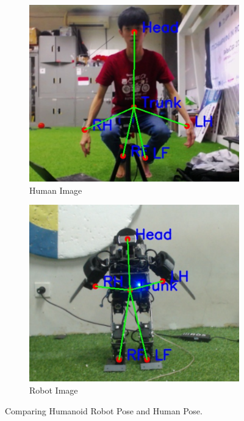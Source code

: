 \begin{figure}
  \centering
  \begin{subfigure}[b]{0.45\textwidth}
      \centering
      \includegraphics[width=\textwidth]{gambar/human_6_result.jpg}
      \caption{Human Image}
      \label{fig:humanimageb}
  \end{subfigure}
  \hfill
  \begin{subfigure}[b]{0.45\textwidth}
      \centering
      \includegraphics[width=\textwidth]{gambar/robot_6_result.jpg}
      \caption{Robot Image}
      \label{fig:robotimageb}
  \end{subfigure}
     \caption{Comparing Humanoid Robot Pose and Human Pose.}
     \label{fig:comparingb}
\end{figure}

